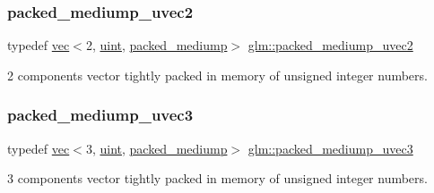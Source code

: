 \mbox{\label{group__gtc__type__aligned_ga18dd6e7cd05a4239428b2a0751d48d4a}} 
\subsubsection{\texorpdfstring{packed\+\_\+mediump\+\_\+uvec2}{packed\_mediump\_uvec2}}
{\footnotesize\ttfamily typedef \hyperlink{structglm_1_1vec}{vec}$<$2, \hyperlink{group__core__precision_ga4fd29415871152bfb5abd588334147c8}{uint}, \hyperlink{namespaceglm_a36ed105b07c7746804d7fdc7cc90ff25a9604654c3b137cd7898689fd34b25bc0}{packed\+\_\+mediump}$>$ \hyperlink{group__gtc__type__aligned_ga18dd6e7cd05a4239428b2a0751d48d4a}{glm\+::packed\+\_\+mediump\+\_\+uvec2}}



2 components vector tightly packed in memory of unsigned integer numbers. 

\mbox{\label{group__gtc__type__aligned_gaa79317c123076b994c5c1b46a5b41351}} 
\subsubsection{\texorpdfstring{packed\+\_\+mediump\+\_\+uvec3}{packed\_mediump\_uvec3}}
{\footnotesize\ttfamily typedef \hyperlink{structglm_1_1vec}{vec}$<$3, \hyperlink{group__core__precision_ga4fd29415871152bfb5abd588334147c8}{uint}, \hyperlink{namespaceglm_a36ed105b07c7746804d7fdc7cc90ff25a9604654c3b137cd7898689fd34b25bc0}{packed\+\_\+mediump}$>$ \hyperlink{group__gtc__type__aligned_gaa79317c123076b994c5c1b46a5b41351}{glm\+::packed\+\_\+mediump\+\_\+uvec3}}



3 components vector tightly packed in memory of unsigned integer numbers. 

